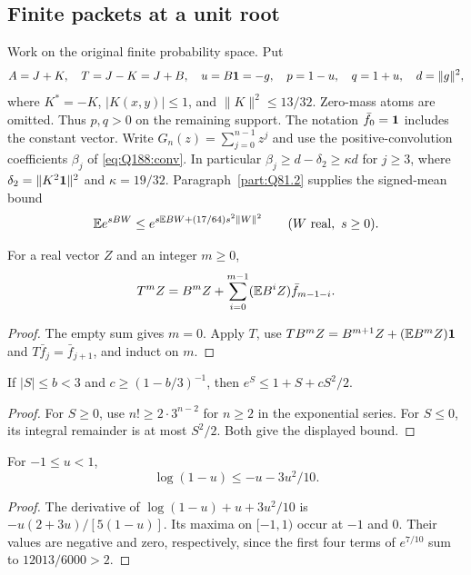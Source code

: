 \subsection{Finite packets at a unit root}
\label{sec:unit-two-step-packets}
Work on the original finite probability space. Put
\[
 A=J+K,\quad T=J-K=J+B,\quad u=B\mathbf1=-g,\quad
 p=1-u,\quad q=1+u,\quad d=\|g\|^2,
\]
where $K^*=-K$, $|K(x,y)|\le1$, and $\|K\|^2\le13/32$.
Zero-mass atoms are omitted. Thus $p,q>0$ on the remaining support.
The notation $\bar f_0=\mathbf1$ includes the constant vector. Write
$G_n(z)=\sum_{j=0}^{n-1}z^j$ and use the positive-convolution
coefficients $\beta_j$ of \eqref{eq:Q188:conv}.
In particular $\beta_j\ge d-\delta_2\ge\kappa d$ for $j\ge3$,
where $\delta_2=\|K^2\mathbf1\|^2$ and $\kappa=19/32$.
Paragraph~\ref{part:Q81.2} supplies the signed-mean bound
\begin{equation}\label{eq:unit-two-step:signed-exponential}
 \mathbb E e^{sBW}\le
 e^{s\mathbb E BW+(17/64)s^2\|W\|^2}
 \qquad(W\text{ real},\ s\ge0).
\end{equation}

\begin{lemma}\label{lem:oc:finite-continuation}
For a real vector $Z$ and an integer $m\ge0$,
\begin{equation}\label{eq:oc:finite-duhamel}
 T^mZ=B^mZ+\sum_{i=0}^{m-1}(\mathbb E B^iZ)\bar f_{m-1-i}.
\end{equation}
\end{lemma}
\begin{proof}
The empty sum gives $m=0$. Apply $T$, use
$TB^mZ=B^{m+1}Z+(\mathbb E B^mZ)\mathbf1$ and
$T\bar f_j=\bar f_{j+1}$, and induct on $m$.
\end{proof}

\begin{lemma}
\label{lem:unit-two-step:exponential-envelope}
If $|S|\le b<3$ and $c\ge(1-b/3)^{-1}$, then
$e^S\le1+S+cS^2/2$.
\end{lemma}
\begin{proof}
For $S\ge0$, use $n!\ge2\cdot3^{n-2}$ for $n\ge2$ in the
exponential series. For $S\le0$, its integral remainder is at
most $S^2/2$. Both give the displayed bound.
\end{proof}

\begin{lemma}\label{lem:unit-two-step:unit-log}
For $-1\le u<1$,
\[
 \log(1-u)\le-u-3u^2/10.
\]
\end{lemma}
\begin{proof}
The derivative of $\log(1-u)+u+3u^2/10$ is
$-u(2+3u)/[5(1-u)]$. Its maxima on $[-1,1)$ occur at $-1$
and $0$. Their values are negative and zero, respectively,
since the first four terms of $e^{7/10}$ sum to $12013/6000>2$.
\end{proof}

